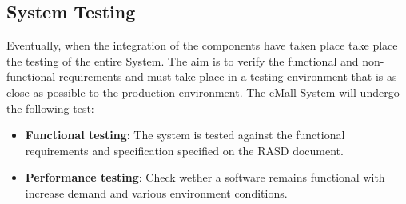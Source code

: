 \subsection{System Testing}
Eventually, when the integration of the components have taken place take place the testing of the entire System. 
The aim is to verify the functional and non-functional requirements and must take place in a testing
environment that is as close as possible to the production environment. 
The eMall System will undergo the following test:
\begin{itemize}
    \item \textbf{Functional testing}: The system is tested against the functional requirements and specification 
    specified on the RASD document.
    \item \textbf{Performance testing}: Check wether a software remains functional with increase demand and 
    various environment conditions.
\end{itemize}
